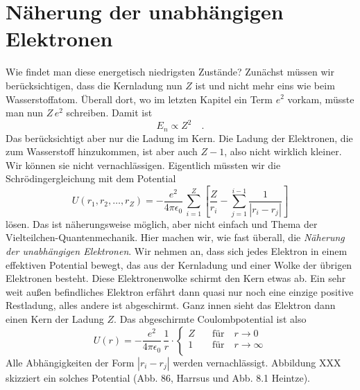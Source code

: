 \section{Näherung der unabhängigen Elektronen}

Wie findet man diese energetisch niedrigsten Zustände? Zunächst müssen wir berücksichtigen, dass die Kernladung nun $Z$ ist und nicht mehr eins wie beim Wasserstoffatom. Überall dort, wo im letzten Kapitel ein Term $e^2$ vorkam, müsste man nun $Z \, e^2$ schreiben. Damit ist 
\begin{equation}
    E_n \propto Z^2  \quad .
\end{equation}
Das  berücksichtigt aber nur die Ladung im Kern. Die Ladung der Elektronen, die zum Wasserstoff hinzukommen, ist aber auch $Z-1$, also nicht wirklich kleiner. Wir können sie nicht vernachlässigen. Eigentlich müssten wir die Schrödingergleichung mit dem Potential
\begin{equation}
    U(r_1, r_2, \dots, r_Z) = -\frac{e^2}{4 \pi \epsilon_0} \, \sum_{i=1}^Z  \left[  \frac{Z}{r_i} - \sum_{j=1}^{i-1}  \frac{1}{|r_i - r_j|} \right]
\end{equation} 
lösen. Das ist näherungsweise möglich, aber nicht einfach und Thema der Vielteilchen-Quantenmechanik. Hier machen wir, wie fast überall, die \emph{Näherung der unabhängigen Elektronen}. Wir nehmen an, dass sich jedes Elektron in einem effektiven Potential bewegt, das aus der Kernladung und einer Wolke der übrigen Elektronen besteht. Diese Elektronenwolke schirmt den Kern etwas ab. Ein sehr weit außen befindliches Elektron erfährt dann quasi nur noch eine einzige positive Restladung, alles andere ist abgeschirmt. Ganz innen sieht das Elektron dann einen Kern der Ladung $Z$. Das abgeschirmte Coulombpotential ist also
\begin{equation}
    U(r) =  -\frac{e^2}{4 \pi \epsilon_0} \, \frac{1}{r} \cdot
    \left\{
 \begin{matrix}
     Z \quad  & \text{für} \quad  r  \rightarrow  0 \\
     1     & \text{für} \quad  r \rightarrow \infty \\
 \end{matrix}
    \right.
\end{equation}
Alle Abhängigkeiten der Form $|r_i - r_j|$ werden vernachlässigt. Abbildung XXX skizziert ein solches Potential (Abb. 86, Harrsus und Abb. 8.1 Heintze).

